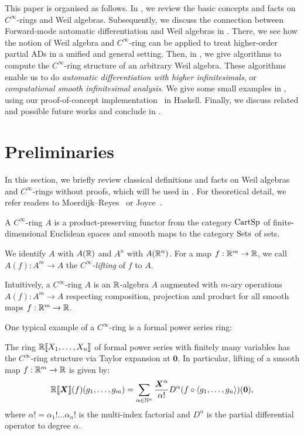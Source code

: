 \documentclass[runningheads]{llncs}
\begin{document}
This paper is organised as follows.
In , we review the basic concepts and facts on $C^\infty$-rings and Weil algebras.
Subsequently, we discuss the connection between Forward-mode automatic differentiation and Weil algebras in .
There, we see how the notion of Weil algebra and $C^\infty$-ring can be applied to treat higher-order partial ADs in a unified and general setting.
Then, in , we give algorithms to compute the $C^\infty$-ring structure of an arbitrary Weil algebra. These algorithms enable us to do \emph{automatic differentiation with higher infinitesimals}, or \emph{computational smooth infinitesimal analysis}.
We give some small examples in , using our proof-of-concept implementation~\cite{Ishii:2020aa} in Haskell.
Finally, we discuss related and possible future works and conclude in .

\section{Preliminaries}\label{sec:prel}
In this section, we briefly review classical definitions and facts on Weil algebras and $C^\infty$-rings without proofs, which will be used in .
For theoretical detail, we refer readers to Moerdijk--Reyes~\cite[Chapters I and II]{Moerdijk:1991aa} or Joyce~\cite{joyce2016algebraic}.

\begin{definition}
  A \emph{$C^\infty$}-ring $A$ is a product-preserving functor from the category $\mathord{\mathrm{CartSp}}$ of finite-dimensional Euclidean spaces and smooth maps to the category $\mathord{\mathrm{Sets}}$ of sets.

  We identify $A$ with $A(\mathbb{R})$ and $A^n$ with $A(\mathbb{R}^n)$.
  For a map $f: \mathbb{R}^m \to \mathbb{R}$, we call $A(f): A^m \to A$ the \emph{$C^\infty$-lifting} of $f$ to $A$.
\end{definition}

Intuitively, a $C^\infty$-ring $A$ is an $\mathbb{R}$-algebra $A$ augmented with $m$-ary operations $A(f): A^m \to A$ respecting composition, projection and product for all smooth maps $f: \mathbb{R}^m \to \mathbb{R}$.

One typical example of a $C^\infty$-ring is a formal power series ring:

\begin{theorem}[Lawvere]\label{thm:series-is-smooth}
  The ring $\mathbb{R}\llbracket X_1, \dots, X_n\rrbracket$ of formal power series with finitely many variables has the $C^\infty$-ring structure via Taylor expansion at $\boldsymbol{0}$.
  In particular, lifting of a smooth map $f: \mathbb{R}^m \to \mathbb{R}$ is given by:
  \[
    \mathord{\mathbb{R}\llbracket\boldsymbol{X}\rrbracket}(f)(g_1, \dots, g_m) = \sum_{\alpha \in \mathbb{N}^n} \frac{\boldsymbol{X}^\alpha}{\alpha!} D^\alpha(f \circ \braket{g_1, \dots, g_n})(\boldsymbol{0}),
  \]
  where $\alpha! = \alpha_1 ! \dots \alpha_n !$ is the multi-index factorial and $D^\alpha$ is the partial differential operator to degree $\alpha$.
\end{theorem}
\end{document}
